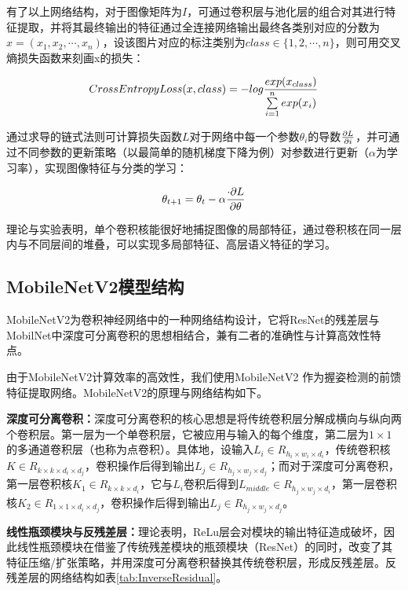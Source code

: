 有了以上网络结构，对于图像矩阵为$I$，可通过卷积层与池化层的组合对其进行特征提取，并将其最终输出的特征通过全连接网络输出最终各类别对应的分数为$x=(x_1, x_2, \cdots, x_n)$，设该图片对应的标注类别为$class \in \{1,2,\cdots,n\}$，则可用交叉熵损失函数来刻画x的损失：

\begin{equation}
    CrossEntropyLoss(x,class) = -log{exp(x_{class}) \over \sum\limits_{i=1}^n exp(x_i)}
\end{equation}

通过求导的链式法则可计算损失函数$L$对于网络中每一个参数$\theta_i$的导数$\partial L \over \partial i$，并可通过不同参数的更新策略（以最简单的随机梯度下降为例）对参数进行更新（$\alpha$为学习率），实现图像特征与分类的学习：

\begin{equation}
    \theta_{t+1} = \theta_t - \alpha {\cdot \partial L \over \partial \theta}
\end{equation}

理论与实验表明，单个卷积核能很好地捕捉图像的局部特征，通过卷积核在同一层内与不同层间的堆叠，可以实现多局部特征、高层语义特征的学习。

\subsection{MobileNetV2模型结构}

MobileNetV2为卷积神经网络中的一种网络结构设计，它将ResNet的残差层与MobilNet中深度可分离卷积的思想相结合，兼有二者的准确性与计算高效性特点。

由于MobileNetV2计算效率的高效性，我们使用MobileNetV2 作为握姿检测的前馈特征提取网络。MobileNetV2的原理与网络结构如下。

\textbf{深度可分离卷积：}深度可分离卷积的核心思想是将传统卷积层分解成横向与纵向两个卷积层。第一层为一个单卷积层，它被应用与输入的每个维度，第二层为$1 \times 1$的多通道卷积层（也称为点卷积）。具体地，设输入$L_i \in R_{h_i \times w_i \times d_i}$，传统卷积核$K \in R_{k \times k \times d_i \times d_j}$，卷积操作后得到输出$L_j \in R_{h_j \times w_j \times d_j}$；而对于深度可分离卷积，第一层卷积核$K_1 \in R_{k \times k \times d_i}$，它与$L_i$卷积后得到$L_{middle} \in R_{h_j \times w_j \times d_i}$，第一层卷积核$K_2 \in R_{1 \times 1 \times d_i \times d_j}$，卷积操作后得到输出$L_j \in R_{h_j \times w_j \times d_j}$。

\textbf{线性瓶颈模块与反残差层：}理论表明\cite{Sandler_2018}，ReLu层会对模块的输出特征造成破坏，因此线性瓶颈模块在借鉴了传统残差模块的瓶颈模块（ResNet）的同时，改变了其特征压缩/扩张策略，并用深度可分离卷积替换其传统卷积层，形成反残差层。反残差层的网络结构如表\ref{tab:InverseResidual}。

